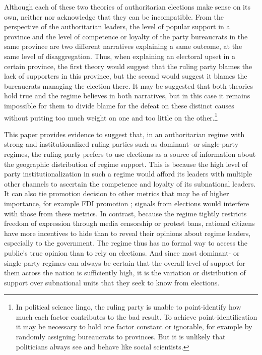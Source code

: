\documentclass[12pt]{article}\usepackage[]{graphicx}\usepackage[]{color}
\newcommand{\1}{\mathbbm{1}}
\begin{document}
Although each of these two theories of authoritarian elections make sense on its own, neither \cite{Magaloni2006} nor \cite{Blaydes2008} acknowledge that they can be incompatible. From the perspective of the authoritarian leaders, the level of popular support in a province and the level of competence or loyalty of the party bureaucrats in the same province are two different narratives explaining a same outcome, at the same level of disaggregation. Thus, when explaining an electoral upset in a certain province, the first theory would suggest that the ruling party blames the lack of supporters in this province, but the second would suggest it blames the bureaucrats managing the election there. It may be suggested that both theories hold true and the regime believes in both narratives, but in this case it remains impossible for them to divide blame for the defeat on these distinct causes without putting too much weight on one and too little on the other.\footnote{In political science lingo, the ruling party is unable to point-identify how much each factor contributes to the bad result. To achieve point-identification it may be necessary to hold one factor constant or ignorable, for example by randomly assigning bureaucrats to provinces. But it is unlikely that politicians always see and behave like social scientists.} 

This paper provides evidence to suggest that, in an authoritarian regime with strong and institutionalized ruling parties such as dominant- or single-party regimes, the ruling party prefers to use elections as a source of information about the geographic distribution of regime support. This is because the high level of party institutionalization in such a regime would afford its leaders with multiple other channels to ascertain the competence and loyalty of its subnational leaders. It can also tie promotion decision to other metrics that may be of higher importance, for example FDI promotion \citep{JensenMalesky2015}; signals from elections would interfere with those from these metrics. In contrast, because the regime tightly restricts freedom of expression through media censorship or protest bans, rational citizens have more incentives to hide than to reveal their opinions about regime leaders, especially to the government. The regime thus has no formal way to access the public's true opinion than to rely on elections. And since most dominant- or single-party regimes can always be certain that the overall level of support for them across the nation is sufficiently high, it is the variation or distribution of support over subnational units that they seek to know from elections.
\end{document}
